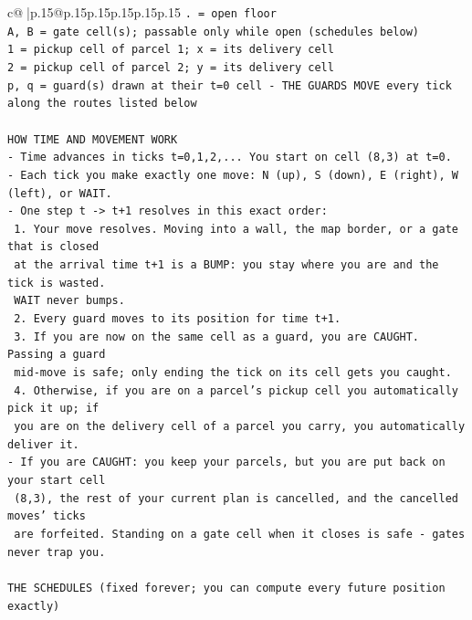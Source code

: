 \documentclass{article}
\begin{document}
{\begin{supertabular}{c@{$\;$}|p{.15\linewidth}@{}p{.15\linewidth}p{.15\linewidth}p{.15\linewidth}p{.15\linewidth}p{.15\linewidth}}
{{{\texttt{. = open floor} \\
\texttt{A, B = gate cell(s); passable only while open (schedules below)} \\
\texttt{1 = pickup cell of parcel 1; x = its delivery cell} \\
\texttt{2 = pickup cell of parcel 2; y = its delivery cell} \\
\texttt{p, q = guard(s) drawn at their t=0 cell {-} THE GUARDS MOVE every tick along the routes listed below} \\
\\ 
\texttt{HOW TIME AND MOVEMENT WORK} \\
\texttt{{-} Time advances in ticks t=0,1,2,... You start on cell (8,3) at t=0.} \\
\texttt{{-} Each tick you make exactly one move: N (up), S (down), E (right), W (left), or WAIT.} \\
\texttt{{-} One step t {-}> t+1 resolves in this exact order:} \\
\texttt{  1. Your move resolves. Moving into a wall, the map border, or a gate that is closed} \\
\texttt{     at the arrival time t+1 is a BUMP: you stay where you are and the tick is wasted.} \\
\texttt{     WAIT never bumps.} \\
\texttt{  2. Every guard moves to its position for time t+1.} \\
\texttt{  3. If you are now on the same cell as a guard, you are CAUGHT. Passing a guard} \\
\texttt{     mid{-}move is safe; only ending the tick on its cell gets you caught.} \\
\texttt{  4. Otherwise, if you are on a parcel's pickup cell you automatically pick it up; if} \\
\texttt{     you are on the delivery cell of a parcel you carry, you automatically deliver it.} \\
\texttt{{-} If you are CAUGHT: you keep your parcels, but you are put back on your start cell} \\
\texttt{  (8,3), the rest of your current plan is cancelled, and the cancelled moves' ticks} \\
\texttt{  are forfeited. Standing on a gate cell when it closes is safe {-} gates never trap you.} \\
\\ 
\texttt{THE SCHEDULES (fixed forever; you can compute every future position exactly)} \\
}}}
\end{supertabular}}
\end{document}
